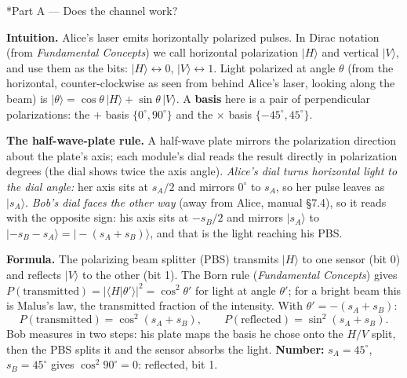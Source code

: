 \documentclass[a4paper,11pt]{article}
\makeatletter
\providecommand{\ket}[1]{|#1\rangle}
\providecommand{\braket}[2]{\langle#1|#2\rangle}
\renewcommand\section{\@startsection{section}{1}{\z@}{-1.6ex \@plus -.5ex}{0.6ex}{\normalfont\large\bfseries\color{ibmblue}}}
\makeatother
\begin{document}
\section*{Part A --- Does the channel work?}

\textbf{Intuition.} Alice's laser emits horizontally polarized pulses. In Dirac notation (from
\textit{Fundamental Concepts}) we call horizontal polarization $\ket{H}$ and vertical $\ket{V}$, and use them as the bits: $\ket{H}
\leftrightarrow 0$, $\ket{V} \leftrightarrow 1$. Light polarized at angle $\theta$
(from the horizontal, counter-clockwise as seen from behind Alice's laser, looking along
the beam) is $\ket{\theta} = \cos\theta\,\ket{H} + \sin\theta\,\ket{V}$. A
\textbf{basis} here is a pair of perpendicular polarizations: the $+$ basis
$\{0^\circ, 90^\circ\}$ and the $\times$ basis $\{-45^\circ, 45^\circ\}$.

\textbf{The half-wave-plate rule.} A half-wave plate mirrors the polarization direction
about the plate's axis; each module's dial reads the result directly in polarization
degrees (the dial shows twice the axis angle). \emph{Alice's dial turns horizontal light
to the dial angle:} her axis sits at $s_A/2$ and mirrors $0^\circ$ to $s_A$, so her
pulse leaves as $\ket{s_A}$. \emph{Bob's dial faces the other way} (away from Alice, manual \S7.4),
so it reads with the opposite sign: his axis sits at $-s_B/2$ and mirrors $\ket{s_A}$
to $\ket{-s_B - s_A} = \ket{-(s_A+s_B)}$, and that is the light reaching his PBS.

\textbf{Formula.} The polarizing beam splitter (PBS) transmits $\ket{H}$ to one
sensor (bit 0) and reflects $\ket{V}$ to the other (bit 1). The Born rule (\textit{Fundamental Concepts}) gives
$P(\text{transmitted}) = |\braket{H}{\theta'}|^2 = \cos^2\theta'$ for light at angle
$\theta'$; for a bright beam this is Malus's law, the transmitted fraction of the
intensity. With $\theta' = -(s_A + s_B)$:
\begin{equation*}
  P(\text{transmitted}) = \cos^2(s_A + s_B), \qquad P(\text{reflected}) = \sin^2(s_A + s_B).
\end{equation*}
Bob measures in two steps: his plate maps the basis he chose onto the $H/V$ split, then
the PBS splits it and the sensor absorbs the light.
\textbf{Number:} $s_A = 45^\circ$, $s_B = 45^\circ$ gives $\cos^2 90^\circ = 0$:
reflected, bit 1.
\end{document}
